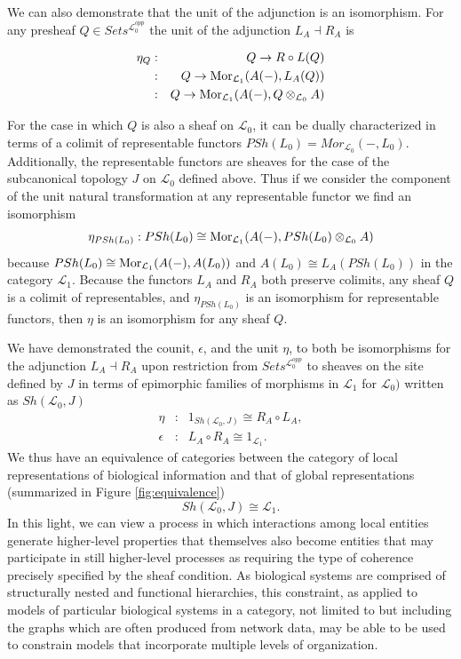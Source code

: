 \documentclass[aps,twocolumn]{revtex4-1}
\begin{document}
We can also demonstrate that the unit of the adjunction is an isomorphism. For any presheaf $Q \in Sets^{\mathcal{L}_0^{opp}}$ the unit of the adjunction $L_A \dashv R_A$ is 

\begin{eqnarray*}
\eta_{Q} &:& Q \rightarrow R \circ L(Q)\\
&:& Q \rightarrow \mathop{\rm Mor}\nolimits_{\mathcal{L}_1}(A(-),L_A(Q))\\ 
&:& Q \rightarrow \mathop{\rm Mor}\nolimits_{\mathcal{L}_1}(A(-), Q \otimes_{\mathcal{L}_0} A)
\end{eqnarray*}

For the case in which $Q$ is also a sheaf on $\mathcal{L}_0$, it can be dually characterized in terms of a colimit of representable functors $PSh(L_0) = Mor_{\mathcal{L}_0}(-,L_0)$. Additionally, the representable functors are sheaves for the case of the subcanonical topology $J$ on $\mathcal{L}_0$ defined above. Thus if we consider the component of the unit natural transformation at any representable functor we find an isomorphism
$$
\eta_{PSh(L_0)}: PSh(L_0) \cong \mathop{\rm Mor}\nolimits_{\mathcal{L}_1}(A(-), PSh(L_0) \otimes_{\mathcal{L}_0} A)
$$
because $PSh(L_0) \cong \mathop{\rm Mor}\nolimits_{\mathcal{L}_1}(A(-), A(L_0))$ and $A(L_0) \cong L_A(PSh(L_0))$ in the category $\mathcal{L}_1$. Because the functors $L_A$ and $R_A$ both preserve colimits, any sheaf $Q$ is a colimit of representables, and $\eta_{PSh(L_0)}$ is an isomorphism for representable functors, then $\eta$ is an isomorphism for any sheaf $Q$.

We have demonstrated the counit, $\epsilon$, and the unit $\eta$, to both be isomorphisms for the adjunction $L_A \dashv R_A$ upon restriction from $Sets^{\mathcal{L}_0^{opp}}$ to sheaves on the site defined by $J$ in terms of epimorphic families of morphisms in $\mathcal{L}_1$ for $\mathcal{L}_0)$ written as $Sh(\mathcal{L}_0,J)$ 
\begin{eqnarray*}
\eta &:& 1_{Sh(\mathcal{L}_0,J)} \cong R_A \circ L_A,\\
\epsilon &:& L_A \circ R_A \cong 1_{\mathcal{L}_1}.
\end{eqnarray*}
We thus have an equivalence of categories between the category of local representations of biological information and that of global representations (summarized in Figure \ref{fig:equivalence})
$$
Sh(\mathcal{L}_0,J) \cong \mathcal{L}_1.
$$
In this light, we can view a process in which interactions among local entities generate higher-level properties that themselves also become entities that may participate in still higher-level processes as requiring the type of coherence precisely specified by the sheaf condition. As biological systems are comprised of structurally nested and functional hierarchies, this constraint, as applied to models of particular biological systems in a category, not limited to but including the graphs which are often produced from network data, may be able to be used to constrain models that incorporate multiple levels of organization.
\end{document}
